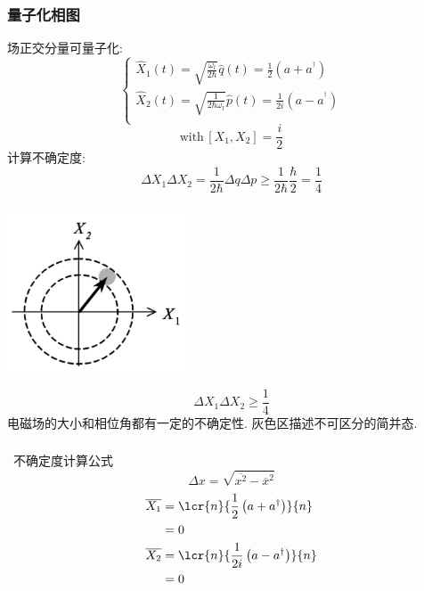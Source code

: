 \begin{frame}
  \frametitle{量子化相图}
  场正交分量可量子化:
  \[ \begin{cases}
    \hat{X}_{1}(t) = \sqrt{\frac{\omega_l}{2\hbar}}\hat{q}(t)=\frac{1}{2}\left(a+a^{^{\dagger}}\right)\\ 
    \hat{X}_{2}(t) = \sqrt{\frac{1}{2\hbar \omega_l}}\hat{p}(t)= \frac{1}{2 i}\left(a-a^{^{\dagger}}\right)\\ 
   \end{cases} \]
  \[ \text{with} \, [X_1, X_2] =\frac{i}{2} \]
  计算不确定度:
  \[ \Delta X_1 \Delta X_2  = \frac{1}{2\hbar}  \Delta q \Delta p \geq \frac{1}{2\hbar} \frac{\hbar}{2}=\frac{1}{4}  \]
\end{frame}

\begin{frame}
    \frametitle{} 
    \begin{center}
       \includegraphics[width=0.4\textwidth]{figs/2022-04-27-15-34-34.png}
    \end{center}
    \[ \Delta X_1 \Delta X_2  \geq  \frac{1}{4}  \]
    电磁场的大小和相位角都有一定的不确定性. 灰色区描述不可区分的简并态. 
\end{frame}

\begin{frame}
  \frametitle{}
  \例[4.试证明真空态是最小不确定度乘积态]{
   \[ \Delta X_1 \Delta X_2 =\dfrac{1}{4}, \, \Delta X_1 = \Delta X_2 = \frac{1}{2} \] 
  }
  \解~不确定度计算公式\[ \Delta x  = \sqrt{ \overline{x^2}- \overline{x}^2}\] 
\[ 
\begin{aligned}
  \overline{ X_1}  &= \lcr{n}{\frac{1}{2}\left(a+a^{\dagger}\right)}{n} \\ 
        &= 0 \\
  \overline{ X_2 } &= \lcr{n}{\frac{1}{2i}\left(a-a^{\dagger}\right)}{n} \\ 
        &= 0 
\end{aligned}\]
\end{frame}

